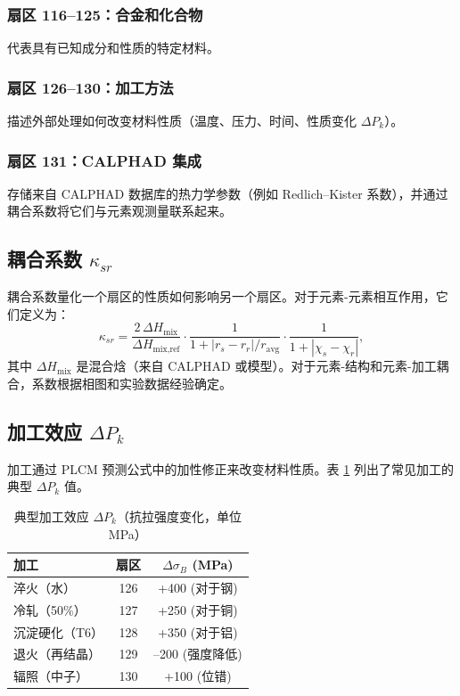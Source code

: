 \documentclass[12pt,a4paper]{article}
\begin{document}
	\subsubsection{扇区 116–125：合金和化合物}
	代表具有已知成分和性质的特定材料。
	
	\subsubsection{扇区 126–130：加工方法}
	描述外部处理如何改变材料性质（温度、压力、时间、性质变化 \(\Delta P_k\)）。
	
	\subsubsection{扇区 131：CALPHAD 集成}
	存储来自 CALPHAD 数据库的热力学参数（例如 Redlich–Kister 系数），并通过耦合系数将它们与元素观测量联系起来。
	
	\subsection{耦合系数 \(\kappa_{sr}\)}
	
	耦合系数量化一个扇区的性质如何影响另一个扇区。对于元素-元素相互作用，它们定义为：
	\[
	\kappa_{sr} = \frac{2\,\Delta H_{\text{mix}}}{\Delta H_{\text{mix,ref}}} \cdot
	\frac{1}{1 + |r_s - r_r|/r_{\text{avg}}} \cdot
	\frac{1}{1 + |\chi_s - \chi_r|},
	\]
	其中 \(\Delta H_{\text{mix}}\) 是混合焓（来自 CALPHAD 或模型）。对于元素-结构和元素-加工耦合，系数根据相图和实验数据经验确定。
	
	\subsection{加工效应 \(\Delta P_k\)}
	\label{sec:processing}
	
	加工通过 PLCM 预测公式中的加性修正来改变材料性质。表 \ref{tab:processing-effects} 列出了常见加工的典型 \(\Delta P_k\) 值。
	
	\begin{table}[htbp]
		\centering
		\caption{典型加工效应 \(\Delta P_k\)（抗拉强度变化，单位 MPa）}
		\label{tab:processing-effects}
		\begin{tabular}{lcc}
			\toprule
			加工 & 扇区 & \(\Delta \sigma_B\) (MPa) \\
			\midrule
			淬火（水） & 126 & +400 (对于钢) \\
			冷轧（50\%） & 127 & +250 (对于铜) \\
			沉淀硬化（T6） & 128 & +350 (对于铝) \\
			退火（再结晶） & 129 & –200 (强度降低) \\
			辐照（中子） & 130 & +100 (位错) \\
			\bottomrule
		\end{tabular}
	\end{table}
	
\end{document}
